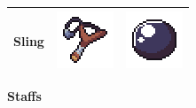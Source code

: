 \documentclass[../Main.tex]{subfiles}
\begin{document}
\begin{center}
\begin{tabular}{ | m{} | m{} | m{} | }
                    \hline
                    \textbf{Sling} & \centerline{\includegraphics[scale=1]{../res/textures/items/weapons/Sling.png}} & \centerline{\includegraphics[scale=3]{../res/textures/projectiles/Rock.png}} \\
                    \hline
                \end{tabular}
            \end{center}
            \textbf{Staffs}
\end{document}
